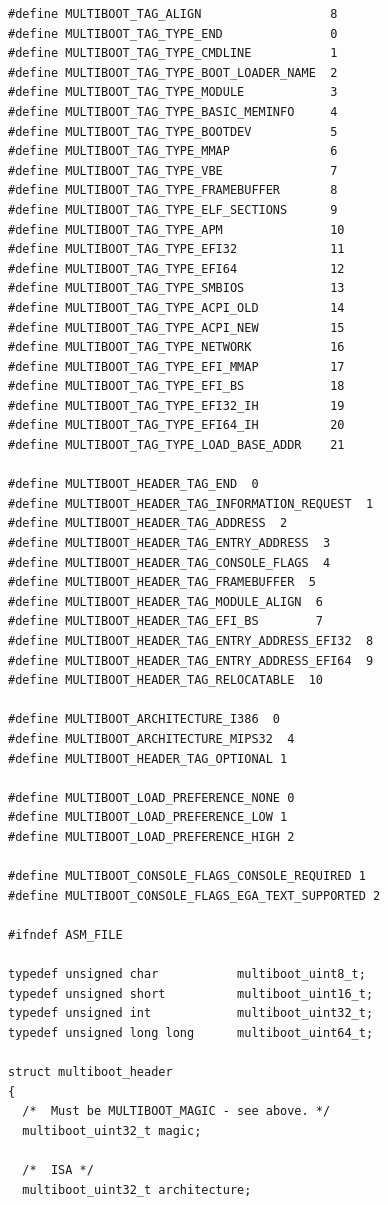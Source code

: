 \documentclass[../main.tex]{subfiles}
\begin{document}
\begin{verbatim}
#define MULTIBOOT_TAG_ALIGN                  8
#define MULTIBOOT_TAG_TYPE_END               0
#define MULTIBOOT_TAG_TYPE_CMDLINE           1
#define MULTIBOOT_TAG_TYPE_BOOT_LOADER_NAME  2
#define MULTIBOOT_TAG_TYPE_MODULE            3
#define MULTIBOOT_TAG_TYPE_BASIC_MEMINFO     4
#define MULTIBOOT_TAG_TYPE_BOOTDEV           5
#define MULTIBOOT_TAG_TYPE_MMAP              6
#define MULTIBOOT_TAG_TYPE_VBE               7
#define MULTIBOOT_TAG_TYPE_FRAMEBUFFER       8
#define MULTIBOOT_TAG_TYPE_ELF_SECTIONS      9
#define MULTIBOOT_TAG_TYPE_APM               10
#define MULTIBOOT_TAG_TYPE_EFI32             11
#define MULTIBOOT_TAG_TYPE_EFI64             12
#define MULTIBOOT_TAG_TYPE_SMBIOS            13
#define MULTIBOOT_TAG_TYPE_ACPI_OLD          14
#define MULTIBOOT_TAG_TYPE_ACPI_NEW          15
#define MULTIBOOT_TAG_TYPE_NETWORK           16
#define MULTIBOOT_TAG_TYPE_EFI_MMAP          17
#define MULTIBOOT_TAG_TYPE_EFI_BS            18
#define MULTIBOOT_TAG_TYPE_EFI32_IH          19
#define MULTIBOOT_TAG_TYPE_EFI64_IH          20
#define MULTIBOOT_TAG_TYPE_LOAD_BASE_ADDR    21

#define MULTIBOOT_HEADER_TAG_END  0
#define MULTIBOOT_HEADER_TAG_INFORMATION_REQUEST  1
#define MULTIBOOT_HEADER_TAG_ADDRESS  2
#define MULTIBOOT_HEADER_TAG_ENTRY_ADDRESS  3
#define MULTIBOOT_HEADER_TAG_CONSOLE_FLAGS  4
#define MULTIBOOT_HEADER_TAG_FRAMEBUFFER  5
#define MULTIBOOT_HEADER_TAG_MODULE_ALIGN  6
#define MULTIBOOT_HEADER_TAG_EFI_BS        7
#define MULTIBOOT_HEADER_TAG_ENTRY_ADDRESS_EFI32  8
#define MULTIBOOT_HEADER_TAG_ENTRY_ADDRESS_EFI64  9
#define MULTIBOOT_HEADER_TAG_RELOCATABLE  10

#define MULTIBOOT_ARCHITECTURE_I386  0
#define MULTIBOOT_ARCHITECTURE_MIPS32  4
#define MULTIBOOT_HEADER_TAG_OPTIONAL 1

#define MULTIBOOT_LOAD_PREFERENCE_NONE 0
#define MULTIBOOT_LOAD_PREFERENCE_LOW 1
#define MULTIBOOT_LOAD_PREFERENCE_HIGH 2

#define MULTIBOOT_CONSOLE_FLAGS_CONSOLE_REQUIRED 1
#define MULTIBOOT_CONSOLE_FLAGS_EGA_TEXT_SUPPORTED 2

#ifndef ASM_FILE

typedef unsigned char           multiboot_uint8_t;
typedef unsigned short          multiboot_uint16_t;
typedef unsigned int            multiboot_uint32_t;
typedef unsigned long long      multiboot_uint64_t;

struct multiboot_header
{
  /*  Must be MULTIBOOT_MAGIC - see above. */
  multiboot_uint32_t magic;

  /*  ISA */
  multiboot_uint32_t architecture;


\end{verbatim}
\end{document}

